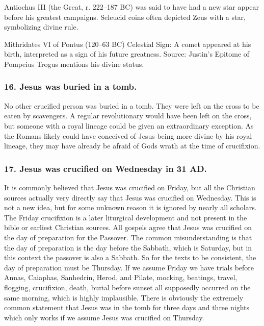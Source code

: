 Antiochus III (the Great, r.
222--187 BC) was said to have had a new star appear before his greatest campaigns.
Seleucid coins often depicted Zeus with a star, symbolizing divine rule.

Mithridates VI of Pontus (120--63 BC) Celestial Sign: A comet appeared at his birth, interpreted as a sign of his future greatness.
Source: Justin's Epitome of Pompeius Trogus mentions his divine status.

\subsubsection{16.
Jesus was buried in a tomb.}\label{subsubsec:jesus-was-buried-in-a-tomb.}

No other crucified person was buried in a tomb.
They were left on the cross to be eaten by scavengers.
A regular revolutionary would have been left on the cross, but someone with a royal lineage could be given an extraordinary exception.
As the Romans likely could have conceived of Jesus being more divine by his royal lineage, they may have already be afraid of Gods wrath at the time of crucifixion.

\subsubsection{17.
Jesus was crucified on Wednesday in 31 AD.}\label{subsubsec:jesus-was-crucified-on-wednesday-in-31-ad.}

It is commonly believed that Jesus was crucified on Friday, but all the Christian sources actually very directly say that Jesus was crucified on Wednesday.
This is not a new idea, but for some unknown reason it is ignored by nearly all scholars.
The Friday crucifixion is a later liturgical development and not present in the bible or earliest Christian sources.
All gospels agree that Jesus was crucified on the day of preparation for the Passover.
The common misunderstanding is that the day of preparation is the day before the Sabbath, which is Saturday, but in this context the passover is also a Sabbath.
So for the texts to be consistent, the day of preparation must be Thursday.
If we assume Friday we have trials before Annas, Caiaphas, Sanhedrin, Herod, and Pilate, mocking, beatings, travel, flogging, crucifixion, death, burial before sunset all supposedly occurred on the same morning, which is highly implausible.
There is obviously the extremely common statement that Jesus was in the tomb for three days and three nights which only works if we assume Jesus was crucified on Thursday.

